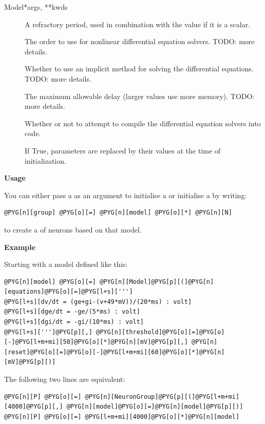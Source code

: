 \documentclass[letterpaper,10pt,english]{manual}
\begin{document}
\begin{classdesc}{Model}{*args, **kwds}
\begin{description}
\item[] \leavevmode
A refractory period, used in combination with the  value
if it is a scalar.

\item[] \leavevmode
The order to use for nonlinear differential equation solvers.
TODO: more details.

\item[] \leavevmode
Whether to use an implicit method for solving the differential
equations. TODO: more details.

\item[] \leavevmode
The maximum allowable delay (larger values use more memory).
TODO: more details.

\item[] \leavevmode
Whether or not to attempt to compile the differential equation
solvers into  code.

\item[] \leavevmode
If True, parameters are replaced by their values at the time
of initialization.

\end{description}

\textbf{Usage}

You can either pass a \hyperlink{brian.Model}{} as an argument to initialise a
\hyperlink{brian.NeuronGroup}{} or initialise a \hyperlink{brian.NeuronGroup}{} by writing:

\begin{Verbatim}[commandchars=@\[\]]
@PYG[n][group] @PYG[o][=] @PYG[n][model] @PYG[o][*] @PYG[n][N]
\end{Verbatim}

to create a \hyperlink{brian.NeuronGroup}{} of  neurons based on that model.

\textbf{Example}

Starting with a model defined like this:

\begin{Verbatim}[commandchars=@\[\]]
@PYG[n][model] @PYG[o][=] @PYG[n][Model]@PYG[p][(]@PYG[n][equations]@PYG[o][=]@PYG[l+s][''']
@PYG[l+s][dv/dt = (ge+gi-(v+49*mV))/(20*ms) : volt]
@PYG[l+s][dge/dt = -ge/(5*ms) : volt]
@PYG[l+s][dgi/dt = -gi/(10*ms) : volt]
@PYG[l+s][''']@PYG[p][,] @PYG[n][threshold]@PYG[o][=]@PYG[o][-]@PYG[l+m+mi][50]@PYG[o][*]@PYG[n][mV]@PYG[p][,] @PYG[n][reset]@PYG[o][=]@PYG[o][-]@PYG[l+m+mi][60]@PYG[o][*]@PYG[n][mV]@PYG[p][)]
\end{Verbatim}

The following two lines are equivalent:

\begin{Verbatim}[commandchars=@\[\]]
@PYG[n][P] @PYG[o][=] @PYG[n][NeuronGroup]@PYG[p][(]@PYG[l+m+mi][4000]@PYG[p][,] @PYG[n][model]@PYG[o][=]@PYG[n][model]@PYG[p][)]
@PYG[n][P] @PYG[o][=] @PYG[l+m+mi][4000]@PYG[o][*]@PYG[n][model]
\end{Verbatim}
\end{classdesc}
\end{document}
